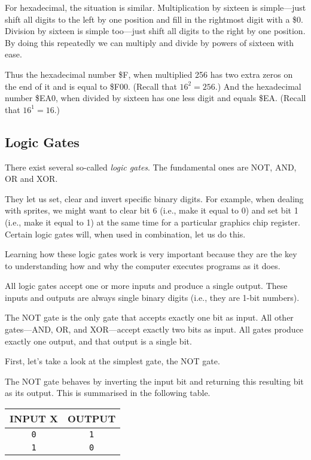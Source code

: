 For hexadecimal, the situation is similar. Multiplication by sixteen is simple---just shift all digits to the left by one position and fill in the rightmost digit with a \$0. Division by sixteen is simple too---just shift all digits to the right by one position. By doing this repeatedly we can multiply and divide by powers of sixteen with ease.

Thus the hexadecimal number \$F, when multiplied 256 has two extra zeros on the end of it and is equal to \$F00. (Recall that $16^{2} = 256$.) And the hexadecimal number \$EA0, when divided by sixteen has one less digit and equals \$EA. (Recall that $16^{1} = 16$.)

\subsection{Logic Gates}

There exist several so-called {\it logic gates}. The fundamental ones are NOT, AND, OR and XOR.

They let us set, clear and invert specific binary digits. For example, when dealing with sprites, we might want to clear bit 6 (i.e., make it equal to 0) and set bit 1 (i.e., make it equal to 1) at the same time for a particular graphics chip register. Certain logic gates will, when used in combination, let us do this.

Learning how these logic gates work is very important because they are the key to understanding how and why the computer executes programs as it does.

All logic gates accept one or more inputs and produce a single output. These inputs and outputs are always single binary digits (i.e., they are 1-bit numbers).

The NOT gate is the only gate that accepts exactly one bit as input. All other gates---AND, OR, and XOR---accept exactly two bits as input. All gates produce exactly one output, and that output is a single bit.

First, let's take a look at the simplest gate, the NOT gate.

The NOT gate behaves by inverting the input bit and returning this resulting bit as its output. This is summarised in the following table.
\begin{center}
	\begin{tabular}{c|c}
	  \hline
		INPUT X & OUTPUT \\ \hline
		\texttt{0} & \texttt{1} \\ \hline
		\texttt{1} & \texttt{0} \\ \hline
	\end{tabular}
\end{center}

